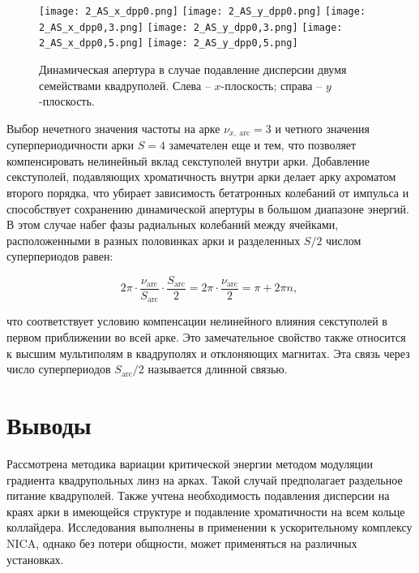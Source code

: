 \begin{figure} [h!]
   \center
   \texttt{[image: 2\_AS\_x\_dpp0.png]}
   \texttt{[image: 2\_AS\_y\_dpp0.png]}
   \texttt{[image: 2\_AS\_x\_dpp0,3.png]}
   \texttt{[image: 2\_AS\_y\_dpp0,3.png]}
   \texttt{[image: 2\_AS\_x\_dpp0,5.png]}
   \texttt{[image: 2\_AS\_y\_dpp0,5.png]}
   \caption{Динамическая апертура в случае подавление дисперсии двумя семействами квадруполей.
Слева – $x$-плоскость; справа – $y$-плоскость.}
   \label{fig:DA_AS_dpp}
\end{figure}

\par Выбор нечетного значения частоты на арке $\nu_{x,\ \text{arc}}=3$ и четного значения суперпериодичности арки $S=4$ замечателен еще и тем, что позволяет компенсировать нелинейный вклад секступолей внутри арки. Добавление секступолей, подавляющих хроматичность внутри арки делает арку ахроматом второго порядка, что убирает зависимость бетатронных колебаний от импульса и способствует сохранению динамической апертуры в большом диапазоне энергий. В этом случае набег фазы радиальных колебаний между ячейками, расположенными в разных половинках арки и разделенных $S/2$ числом суперпериодов равен:

\begin{equation}
2\pi\cdot\frac{\nu_{\text{arc}}}{S_{\text{arc}}}\cdot\frac{S_{\text{arc}}}{2}=2\pi\cdot\frac{\nu_{\text{arc}}}{2}=\pi+2\pi n,\
\label{eq:chrom_period}
\end{equation}

\noindent что соответствует условию компенсации нелинейного влияния секступолей в первом приближении во всей арке. Это замечательное свойство также относится к высшим мультиполям в квадруполях и отклоняющих магнитах. Эта связь через число суперпериодов $S_{\text{arc}}/2$ называется длинной связью.

\section*{Выводы}
\par Рассмотрена методика вариации критической энергии методом модуляции градиента квадрупольных линз на арках. Такой случай предполагает раздельное питание квадруполей. Также учтена необходимость подавления дисперсии на краях арки в имеющейся структуре и подавление хроматичности на всем кольце коллайдера. Исследования выполнены в применении к ускорительному комплексу NICA, однако без потери общности, может применяться на различных установках.

